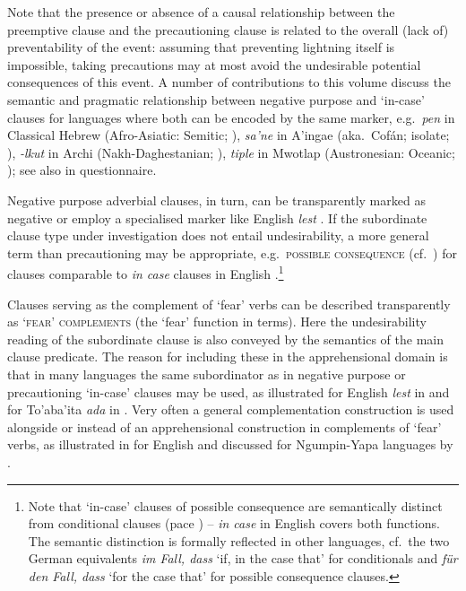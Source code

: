 \documentclass[output=paper,colorlinks,citecolor=brown
]{langscibook}
\begin{document}
Note that the presence or absence of a causal relationship between the preemptive clause and the precautioning clause is related to the overall (lack of) preventability of the event: assuming that preventing lightning itself is impossible, taking precautions may at most avoid the undesirable potential consequences of this event. A number of contributions to this volume discuss the semantic and pragmatic relationship between negative purpose and `in-case' clauses for languages where both can be encoded by the same marker, e.g.\ \textit{pen} in Classical Hebrew (Afro-Asiatic: Semitic; \citealt{chapters/francez}), \textit{sa'ne} in A'ingae (aka.\ Cofán; isolate; \citealt{chapters/dabkowski-anderbois}), \textit{-lkut} in Archi (Nakh-Daghestanian; \citealt{chapters/daniel}), \textit{tiple} in Mwotlap (Austronesian: Oceanic; \citealt{chapters/francois}); see also  in  questionnaire.


Negative purpose adverbial clauses, in turn, can be transparently marked as negative or employ a specialised marker like English \textit{lest} \citep[130]{schmidtkebode2009}. If the subordinate clause type under investigation does not entail undesirability, a more general term than precautioning may be appropriate, e.g.\ \textsc{possible consequence} (cf.\ \cite[2]{dixon2009}) for clauses comparable to \textit{in case} clauses in {English} .\footnote{Note that `in-case' clauses of possible consequence are semantically distinct from conditional clauses (pace \cite[136]{schmidtkebode2009}) -- \textit{in case} in English covers both functions. The semantic distinction is formally reflected in other languages, cf.\ the two German equivalents \textit{im Fall, dass} `if, in the case that' for conditionals and \textit{für den Fall, dass} `for the case that' for possible consequence clauses.}

Clauses serving as the complement of `fear' verbs can be described transparently as \textsc{`fear' complements} (the `fear' function in  terms). Here the undesirability reading of the subordinate clause is also conveyed by the semantics of the main clause predicate. The reason for including these in the apprehensional domain is that in many languages the same subordinator as in negative purpose or precautioning `in-case' clauses may be used, as illustrated for English \textit{lest} in  and for To'aba'ita \textit{ada} in . Very often a general complementation construction is used alongside or instead of an apprehensional construction in complements of `fear' verbs, as illustrated in  for English and discussed for Ngumpin-Yapa languages by \citet{chapters/browne}. 
\end{document}
